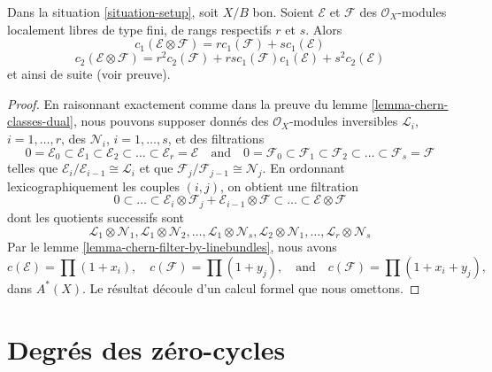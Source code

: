 \begin{lemma}
\label{lemma-chern-classes-tensor-product}
Dans la situation \ref{situation-setup}, soit $X/B$ bon. Soient
$\mathcal{E}$ et $\mathcal{F}$ des $\mathcal{O}_X$-modules localement libres de
type fini, de rangs respectifs $r$ et $s$. Alors
$$
c_1(\mathcal{E} \otimes \mathcal{F})
=
r c_1(\mathcal{F}) + s c_1(\mathcal{E})
$$
$$
c_2(\mathcal{E} \otimes \mathcal{F})
=
r^2 c_2(\mathcal{F}) +
rs c_1(\mathcal{F})c_1(\mathcal{E}) +
s^2 c_2(\mathcal{E})
$$
et ainsi de suite (voir preuve).
\end{lemma}

\begin{proof}
En raisonnant exactement comme dans la preuve du lemme
\ref{lemma-chern-classes-dual}, nous pouvons supposer donnés des
$\mathcal{O}_X$-modules inversibles ${\mathcal L}_i$, $i = 1, \ldots, r$, des
${\mathcal N}_i$, $i = 1, \ldots, s$, et des filtrations
$$
0 = \mathcal{E}_0 \subset \mathcal{E}_1 \subset \mathcal{E}_2
\subset \ldots \subset \mathcal{E}_r = \mathcal{E}
\quad\text{and}\quad
0 = \mathcal{F}_0 \subset \mathcal{F}_1 \subset \mathcal{F}_2
\subset \ldots \subset \mathcal{F}_s = \mathcal{F}
$$
telles que $\mathcal{E}_i/\mathcal{E}_{i - 1} \cong \mathcal{L}_i$ et que
$\mathcal{F}_j/\mathcal{F}_{j - 1} \cong \mathcal{N}_j$. En ordonnant
lexicographiquement les couples $(i, j)$, on obtient une filtration
$$
0 \subset \ldots \subset
\mathcal{E}_i \otimes \mathcal{F}_j
+
\mathcal{E}_{i - 1} \otimes \mathcal{F}
\subset \ldots \subset \mathcal{E} \otimes \mathcal{F}
$$
dont les quotients successifs sont
$$
\mathcal{L}_1 \otimes \mathcal{N}_1,
\mathcal{L}_1 \otimes \mathcal{N}_2,
\ldots,
\mathcal{L}_1 \otimes \mathcal{N}_s,
\mathcal{L}_2 \otimes \mathcal{N}_1,
\ldots,
\mathcal{L}_r \otimes \mathcal{N}_s
$$
Par le lemme \ref{lemma-chern-filter-by-linebundles}, nous avons
$$
c(\mathcal{E}) = \prod (1 + x_i),
\quad
c(\mathcal{F}) = \prod (1 + y_j),
\quad\text{and}\quad
c(\mathcal{F}) = \prod (1 + x_i + y_j),
$$
dans $A^*(X)$. Le résultat découle d'un calcul formel que nous omettons.
\end{proof}











\section{Degrés des zéro-cycles}
\label{section-degree-zero-cycles}

